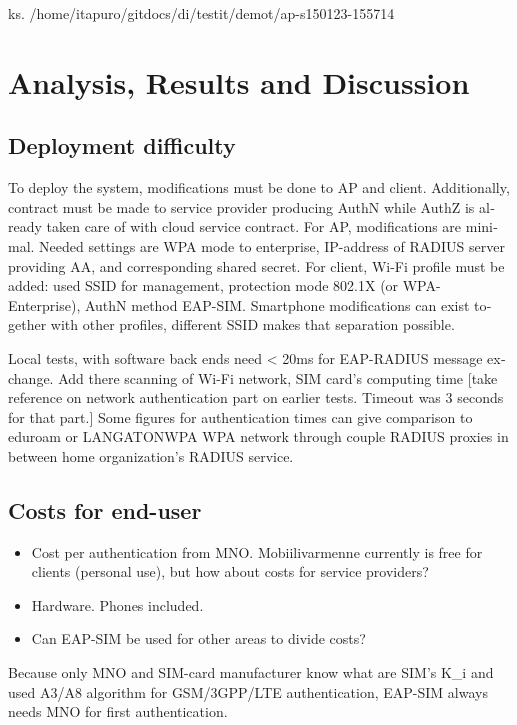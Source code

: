 \documentclass[12pt,a4paper,english]{tutthesis}
\begin{document}
\begin{otherlanguage}{english}
ks. /home/itapuro/gitdocs/di/testit/demot/ap-s150123-155714


\chapter{Analysis, Results and Discussion}
\label{sec-6}



\section{Deployment difficulty}
\label{sec-6-1}

To deploy the system, modifications must be done to AP and client.
Additionally, contract must be made to service
provider producing AuthN while AuthZ is already taken care of with cloud service contract.
For AP, modifications are minimal. Needed settings are
WPA mode to enterprise, IP-address of RADIUS server providing 
AA, and corresponding shared secret.
For client, Wi-Fi profile must be added: used SSID for management,
protection mode 802.1X (or WPA-Enterprise), AuthN method EAP-SIM.
Smartphone modifications can exist together with other
profiles, different SSID makes that separation possible.

Local tests, with software back ends need < 20ms for EAP-RADIUS message
exchange. 
Add there scanning of Wi-Fi network, SIM card's computing
time [take reference on network authentication part on earlier
tests. Timeout was 3 seconds for that part.]
Some figures for authentication times can give comparison to eduroam
or LANGATONWPA WPA network through couple RADIUS proxies in between home
organization's RADIUS service.

\section{Costs for end-user}
\label{sec-6-2}
\begin{itemize}
\item Cost per authentication from MNO. Mobiilivarmenne
currently is free for clients (personal use), but how about costs
for  service providers?
\item Hardware. Phones included.
\item Can EAP-SIM be used for other areas to divide costs?
\end{itemize}

Because only MNO and SIM-card manufacturer know 
what are SIM's K\_i and used A3/A8 algorithm
for GSM/3GPP/LTE authentication,
EAP-SIM always needs MNO for first authentication.



\end{otherlanguage}
\end{document}
